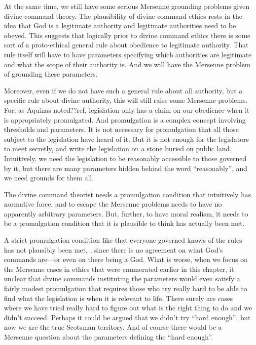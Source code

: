 At the same time, we still have some serious Mersenne grounding problems given divine command theory. The plausibility of divine command ethics rests in
the idea that God is a legitimate authority and legitimate authorities need to be obeyed. This suggests that logically prior
to divine command ethics there is some sort of a proto-ethical general rule about obedience to legitimate authority. That 
rule itself will have to have parameters specifying which authorities are legitimate and what the scope of their authority is. 
And we will have the Mersenne problem of grounding these parameters.

Moreover, even if we do not have such a general rule about all authority, but a specific rule about divine authority, this
will still raise some Mersenne problems. For, as Aquinas noted??ref, legislation only has a claim on our obedience when it 
is appropriately promulgated. And promulgation is a complex concept involving thresholds and parameters. It is not necessary
for promulgation that all those subject to the legislation have heard of it. But it is not enough for the legislators to
meet secretly, and write the legislation on a stone  buried on public land. Intuitively, we need the legislation to be 
reasonably accessible to those governed by it, but there are many parameters hidden behind the word ``reasonably'', and 
we need grounds for them all.

The divine command theorist needs a promulgation condition that intuitively has normative force, and to escape the
Mersenne problems needs to have no apparently arbitrary parameters. But, further, to have moral realism, it needs to
be a promulgation condition that it is plausible to think has actually been met.

A strict promulgation condition like that everyone governed knows of the rules has not plausibly been met, , since
there is no agreement on what God's commands are---or even on there being a God.
What is worse, when we focus on the Mersenne cases in ethics that were enumerated earlier in this chapter, it unclear that divine commands instituting the parameters
would even satisfy a fairly modest promulgation that requires those who try really hard to be able to find what the legislation 
is when it is relevant to life. There surely are cases where we have tried really hard to figure out what is the right thing
to do and we didn't succeed. Perhaps it could be argued that we didn't try ``hard enough'', but now we are the true
Scotsman territory. And of course there would be a Mersenne question about the parameters defining the ``hard enough''.

